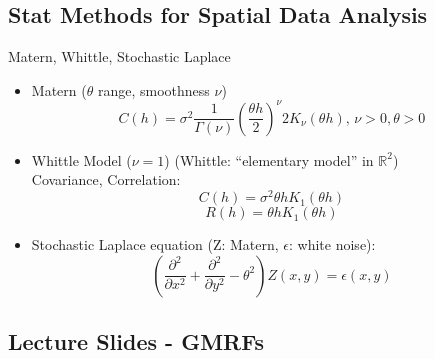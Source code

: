 \documentclass{article}
\begin{document}
\subsection*{Stat Methods for Spatial Data Analysis} 
Matern, Whittle, Stochastic Laplace \citep{Schabenberger2004}
\begin{itemize}
\item Matern ($\theta$ range, smoothness $\nu$)
$$ C(h) = \sigma^{2}\frac{1}{\Gamma(\nu)}\left(\frac{\theta h}{2}\right)^{\nu}2K_{\nu}(\theta h) \text{,   } \nu >0, \theta > 0 $$
\item Whittle Model ($\nu = 1$) (Whittle: ``elementary model'' in $\mathbb{R}^{2}$) \\
Covariance, Correlation:
$$ C(h) = \sigma^{2}\theta h K_{1}(\theta h) $$
$$ R(h) = \theta h K_{1}(\theta h) $$
\item Stochastic Laplace equation (Z: Matern, $\epsilon$: white noise):
$$ \left( \frac{\partial^{2}}{\partial x^{2}} + \frac{\partial^{2}}{\partial y^{2}} - \theta^{2} \right) Z(x,y) = \epsilon(x,y) $$
\end{itemize}



\subsection*{Lecture Slides - GMRFs}
\citep{Lindstrom2014}
\end{document}
